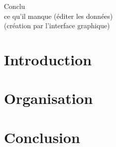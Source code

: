 \documentclass[a4paper]{report}
\begin{document}



\tableofcontents

	Conclu\\
		ce qu'il manque (éditer les données)\\
		(création par l'interface graphique)

	
\chapter{Introduction}



\chapter{Organisation}

	
\chapter{Conclusion}
%
\end{document}
